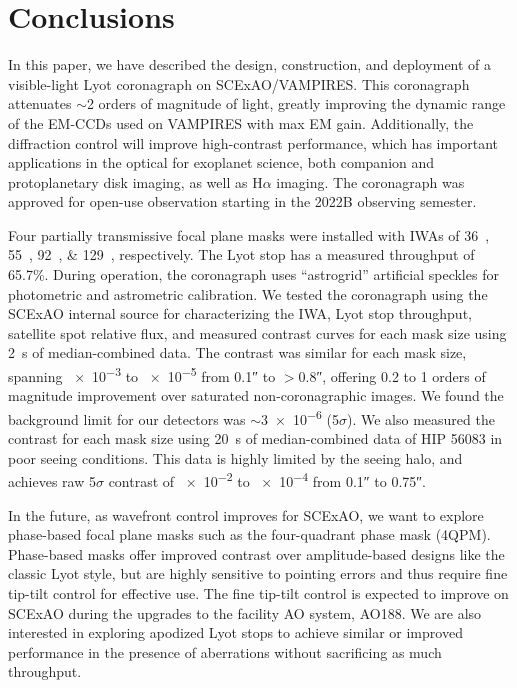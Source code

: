 \documentclass[]{spie}  %
\begin{document}
\section{Conclusions}\label{sec:conclusions}

In this paper, we have described the design, construction, and deployment of a visible-light Lyot coronagraph on SCExAO/VAMPIRES. This coronagraph attenuates $\sim$2 orders of magnitude of light, greatly improving the dynamic range of the EM-CCDs used on VAMPIRES with max EM gain. Additionally, the diffraction control will improve high-contrast performance, which has important applications in the optical for exoplanet science, both companion and protoplanetary disk imaging, as well as H$\alpha$ imaging. The coronagraph was approved for open-use observation starting in the 2022B observing semester.

Four partially transmissive focal plane masks were installed with IWAs of \qtylist{36;55;92;129}{\milliarcsecond}, respectively. The Lyot stop has a measured throughput of 65.7\%. During operation, the coronagraph uses ``astrogrid'' artificial speckles for photometric and astrometric calibration. We tested the coronagraph using the SCExAO internal source for characterizing the IWA, Lyot stop throughput, satellite spot relative flux, and measured contrast curves for each mask size using \qty{2}{\second} of median-combined data. The contrast was similar for each mask size, spanning \num{e-3} to \num{e-5} from \ang{;;0.1} to $>$\ang{;;0.8}, offering 0.2 to 1 orders of magnitude improvement over saturated non-coronagraphic images. We found the background limit for our detectors was $\sim$\num{3e-6} (5$\sigma$). We also measured the contrast for each mask size using \qty{20}{\second} of median-combined data of HIP 56083 in poor seeing conditions. This data is highly limited by the seeing halo, and achieves raw 5$\sigma$ contrast of \num{e-2} to \num{e-4} from \ang{;;0.1} to \ang{;;0.75}.

In the future, as wavefront control improves for SCExAO, we want to explore phase-based focal plane masks such as the four-quadrant phase mask (4QPM)\cite{rouanFourQuadrantPhase2007}. Phase-based masks offer improved contrast over amplitude-based designs like the classic Lyot style, but are highly sensitive to pointing errors and thus require fine tip-tilt control for effective use\cite{huby2017}. The fine tip-tilt control is expected to improve on SCExAO during the upgrades to the facility AO system, AO188\cite{minowa2010}. We are also interested in exploring apodized Lyot stops to achieve similar or improved performance in the presence of aberrations without sacrificing as much throughput.
\end{document}
